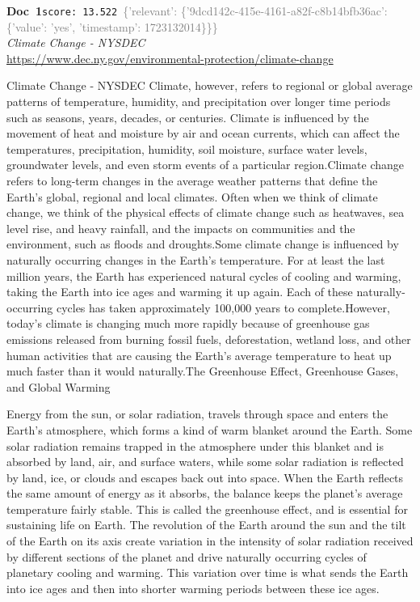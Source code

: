 \documentclass[a4paper,11pt]{article}
\begin{document}
\begin{docenv}
{\footnotesize\textcolor{doccolor}{\textbf{Doc~1}}}\hfill{\tiny\texttt{score:~13.522}}\ {\tiny\textcolor{gray}{\{'relevant': \{'9dcd142c-415e-4161-a82f-c8b14bfb36ac': \{'value': 'yes', 'timestamp': 1723132014\}\}\}}}\\[3pt]
{\small\textit{Climate Change - NYSDEC}}\\[2pt]
{\tiny\url{https://www.dec.ny.gov/environmental-protection/climate-change}}\\[4pt]
{\footnotesize Climate Change - NYSDEC
Climate, however, refers to regional or global average patterns of temperature, humidity, and precipitation over longer time periods such as seasons, years, decades, or centuries. Climate is influenced by the movement of heat and moisture by air and ocean currents, which can affect the temperatures, precipitation, humidity, soil moisture, surface water levels, groundwater levels, and even storm events of a particular region.Climate change refers to long-term changes in the average weather patterns that define the Earth's global, regional and local climates. Often when we think of climate change, we think of the physical effects of climate change such as heatwaves, sea level rise, and heavy rainfall, and the impacts on communities and the environment, such as floods and droughts.Some climate change is influenced by naturally occurring changes in the Earth's temperature. For at least the last million years, the Earth has experienced natural cycles of cooling and warming, taking the Earth into ice ages and warming it up again. Each of these naturally-occurring cycles has taken approximately 100,000 years to complete.However, today's climate is changing much more rapidly because of greenhouse gas emissions released from burning fossil fuels, deforestation, wetland loss, and other human activities that are causing the Earth's average temperature to heat up much faster than it would naturally.The Greenhouse Effect, Greenhouse Gases, and Global Warming

 

Energy from the sun, or solar radiation, travels through space and enters the Earth's atmosphere, which forms a kind of warm blanket around the Earth. Some solar radiation remains trapped in the atmosphere under this blanket and is absorbed by land, air, and surface waters, while some solar radiation is reflected by land, ice, or clouds and escapes back out into space. When the Earth reflects the same amount of energy as it absorbs, the balance keeps the planet's average temperature fairly stable. This is called the greenhouse effect, and is essential for sustaining life on Earth. The revolution of the Earth around the sun and the tilt of the Earth on its axis create variation in the intensity of solar radiation received by different sections of the planet and drive naturally occurring cycles of planetary cooling and warming. This variation over time is what sends the Earth into ice ages and then into shorter warming periods between these ice ages.}
\end{docenv}
\end{document}
